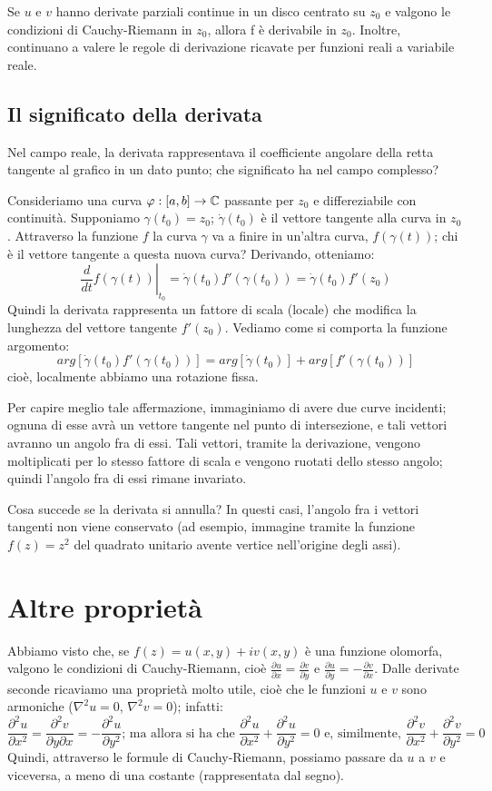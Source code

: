 Se $u$ e $v$ hanno derivate parziali continue in un disco centrato su $z_0$ e valgono le condizioni di Cauchy-Riemann in $z_0$, allora f è derivabile in $z_0$. Inoltre, continuano a valere le regole di derivazione ricavate per funzioni reali a variabile reale.

\subsection{Il significato della derivata}

Nel campo reale, la derivata rappresentava il coefficiente angolare della retta tangente al grafico in un dato punto; che significato ha nel campo complesso?

Consideriamo una curva $\varphi :[a,b] \to \mathbb{C}$ passante per $z_0$ e differeziabile con continuità. Supponiamo $\gamma(t_0)=z_0$; $\dot{\gamma}(t_0)$ è il vettore tangente alla curva in $z_0$. Attraverso la funzione $f$ la curva $\gamma$ va a finire in un'altra curva, $f(\gamma(t))$; chi è il vettore tangente a questa nuova curva? Derivando, otteniamo:
$$\left. \frac{d}{dt}f(\gamma(t))\right|_{t_0} =\dot{\gamma}(t_0) f'(\gamma(t_0)) =\dot{\gamma}(t_0) f'(z_0)$$
Quindi la derivata rappresenta un fattore di scala (locale) che modifica la lunghezza del vettore tangente $f'(z_0)$. Vediamo come si comporta la funzione argomento:
$$arg[\dot{\gamma}(t_0) f'(\gamma(t_0))]=arg[\dot{\gamma}(t_0)]+arg[ f'(\gamma(t_0))]$$ cioè, localmente abbiamo una rotazione fissa.

Per capire meglio tale affermazione, immaginiamo di avere due curve incidenti; ognuna di esse avrà un vettore tangente nel punto di intersezione, e tali vettori avranno un angolo fra di essi. Tali vettori, tramite la derivazione, vengono moltiplicati per lo stesso fattore di scala e vengono ruotati dello stesso angolo; quindi l'angolo fra di essi rimane invariato.

Cosa succede se la derivata si annulla? In questi casi, l'angolo fra i vettori tangenti non viene conservato (ad esempio, immagine tramite la funzione $f(z)=z^2$ del quadrato unitario avente vertice nell'origine degli assi).

\section{Altre proprietà}

Abbiamo visto che, se $f(z)=u(x,y)+iv(x,y)$ è una funzione olomorfa, valgono le condizioni di Cauchy-Riemann, cioè $\frac{\partial u}{\partial x}=\frac{\partial  v}{\partial y}$ e $\frac{\partial  u}{\partial y}=-\frac{\partial v}{\partial x}$. Dalle derivate seconde ricaviamo  una proprietà molto utile, cioè che le funzioni $u$ e $v$ sono  armoniche ($\nabla^2 u=0$, $\nabla^2 v=0$); infatti:
$$\frac{\partial^2 u}{\partial x^2}=\frac{\partial^2 v}{\partial y \partial x}=-\frac{\partial^2 u}{\partial y^2} \text{; ma allora si ha che } \frac{\partial^2 u}{\partial x^2}+\frac{\partial^2 u}{\partial y^2}=0 \text{ e, similmente, } \frac{\partial^2 v}{\partial x^2}+\frac{\partial^2 v}{\partial y^2}=0$$
Quindi, attraverso le formule di Cauchy-Riemann, possiamo passare da $u$ a $v$ e viceversa, a meno di una costante (rappresentata dal segno).

